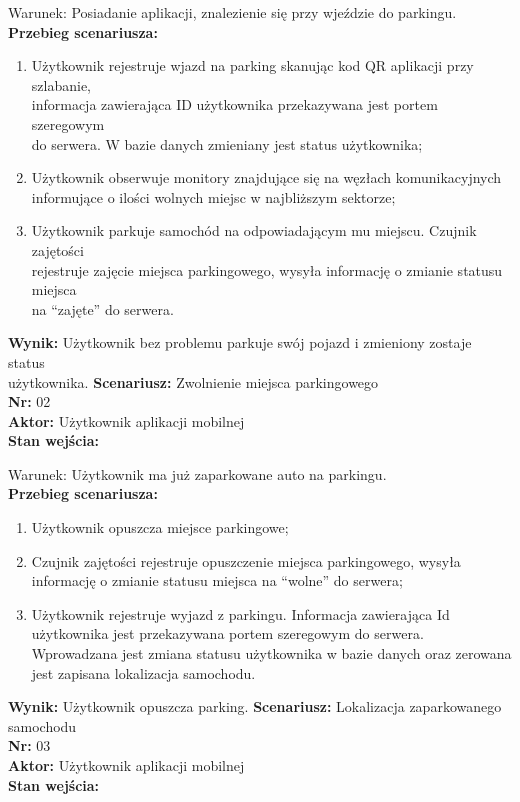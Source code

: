 \documentclass[12pt,a4paper]{article}
\begin{document}
Warunek: Posiadanie aplikacji, znalezienie się przy wjeździe do parkingu.
\\{\bf Przebieg scenariusza:}
\begin{enumerate}
\item Użytkownik rejestruje wjazd na parking skanując kod QR aplikacji przy szlabanie,\\informacja zawierająca ID użytkownika przekazywana jest portem szeregowym\\do serwera. W bazie danych zmieniany jest status użytkownika;
\item Użytkownik obserwuje monitory znajdujące się na węzłach komunikacyjnych\\informujące o ilości wolnych miejsc w najbliższym sektorze;
\item Użytkownik parkuje samochód  na odpowiadającym mu miejscu. Czujnik zajętości\\rejestruje zajęcie miejsca parkingowego, wysyła informację o zmianie statusu miejsca\\na “zajęte” do serwera.
\end{enumerate}
{\bf Wynik:} Użytkownik bez problemu parkuje swój pojazd i zmieniony zostaje status\\użytkownika.
\newline\newline
{\large \bf Scenariusz:} Zwolnienie miejsca parkingowego
\\{\bf Nr:} 02
\\{\bf Aktor:} Użytkownik aplikacji mobilnej
\\{\bf Stan wejścia:}

Warunek: Użytkownik ma już zaparkowane auto na parkingu.
\\{\bf Przebieg scenariusza:}
\begin{enumerate}
\item Użytkownik opuszcza miejsce parkingowe;
\item Czujnik zajętości rejestruje opuszczenie miejsca parkingowego, wysyła informację o zmianie statusu miejsca na “wolne” do serwera;
\item Użytkownik rejestruje wyjazd z parkingu. Informacja zawierająca Id użytkownika jest przekazywana portem szeregowym do serwera. Wprowadzana jest zmiana statusu użytkownika w bazie danych oraz zerowana jest zapisana lokalizacja samochodu.
\end{enumerate}
{\bf Wynik:} Użytkownik opuszcza parking.
\newline\newline\newline\newline\newline\newline\newline\newline\newline\newline
{\large \bf Scenariusz:} Lokalizacja zaparkowanego samochodu
\\{\bf Nr:} 03
\\{\bf Aktor:} Użytkownik aplikacji mobilnej
\\{\bf Stan wejścia:}
\end{document}
